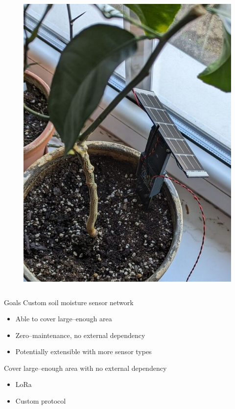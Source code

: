 \documentclass{beamer}
\begin{document}
\begin{frame}
\begin{columns}
\begin{column}{.5\textwidth}
\begin{figure}
        \includegraphics[width=\linewidth]{img/sensor-deploy-up.jpg}
    \end{figure}
\end{column}
\end{columns}
\end{frame}


\begin{frame}{Goals}
Custom soil moisture sensor network
\begin{itemize}
    \item Able to cover large--enough area
    \item Zero--maintenance, no external dependency
    \item Potentially extensible with more sensor types
\end{itemize}
\end{frame}

\begin{frame}{Cover large--enough area with no external dependency}
\begin{itemize}
    \item LoRa
    \item Custom protocol
\end{itemize}
\end{frame}
\end{document}
